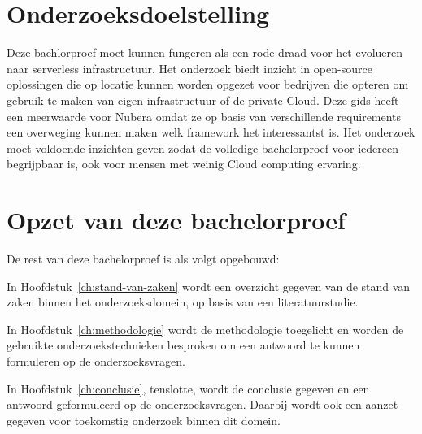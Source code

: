 \section{Onderzoeksdoelstelling}
\label{sec:onderzoeksdoelstelling}

Deze bachlorproef moet kunnen fungeren als een rode draad voor het evolueren naar serverless infrastructuur. Het onderzoek biedt inzicht in open-source oplossingen die op locatie kunnen worden opgezet voor bedrijven die opteren om gebruik te maken van eigen infrastructuur of de private Cloud. Deze gids heeft een meerwaarde voor Nubera omdat ze op basis van verschillende requirements een overweging kunnen maken welk framework het interessantst is. Het onderzoek moet voldoende inzichten geven zodat de volledige bachelorproef voor iedereen begrijpbaar is, ook voor mensen met weinig Cloud computing ervaring.


\section{Opzet van deze bachelorproef}
\label{sec:opzet-bachelorproef}


De rest van deze bachelorproef is als volgt opgebouwd:

In Hoofdstuk~\ref{ch:stand-van-zaken} wordt een overzicht gegeven van de stand van zaken binnen het onderzoeksdomein, op basis van een literatuurstudie.

In Hoofdstuk~\ref{ch:methodologie} wordt de methodologie toegelicht en worden de gebruikte onderzoekstechnieken besproken om een antwoord te kunnen formuleren op de onderzoeksvragen.


In Hoofdstuk~\ref{ch:conclusie}, tenslotte, wordt de conclusie gegeven en een antwoord geformuleerd op de onderzoeksvragen. Daarbij wordt ook een aanzet gegeven voor toekomstig onderzoek binnen dit domein.

